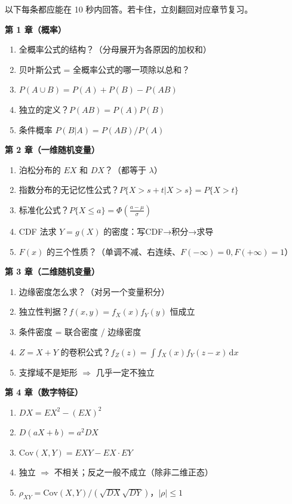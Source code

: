 ﻿\documentclass[lang=cn,11pt]{elegantbook}
\begin{document}
\begin{note}
以下每条都应能在 10 秒内回答。若卡住，立刻翻回对应章节复习。

\textbf{第 1 章（概率）}
\begin{enumerate}
    \item 全概率公式的结构？（分母展开为各原因的加权和）
    \item 贝叶斯公式 = 全概率公式的哪一项除以总和？
    \item $P(A\cup B)=P(A)+P(B)-P(AB)$
    \item 独立的定义？$P(AB)=P(A)P(B)$
    \item 条件概率 $P(B|A)=P(AB)/P(A)$
\end{enumerate}

\textbf{第 2 章（一维随机变量）}
\begin{enumerate}
    \item 泊松分布的 $EX$ 和 $DX$？（都等于 $\lambda$）
    \item 指数分布的无记忆性公式？$P\{X>s+t|X>s\}=P\{X>t\}$
    \item 标准化公式？$P\{X\leq a\}=\Phi\left(\frac{a-\mu}{\sigma}\right)$
    \item CDF 法求 $Y=g(X)$ 的密度：写CDF→积分→求导
    \item $F(x)$ 的三个性质？（单调不减、右连续、$F(-\infty)=0,F(+\infty)=1$）
\end{enumerate}

\textbf{第 3 章（二维随机变量）}
\begin{enumerate}
    \item 边缘密度怎么求？（对另一个变量积分）
    \item 独立性判据？$f(x,y)=f_X(x)f_Y(y)$ 恒成立
    \item 条件密度 = 联合密度 / 边缘密度
    \item $Z=X+Y$ 的卷积公式？$f_Z(z)=\int f_X(x)f_Y(z-x)\,\mathrm{d}x$
    \item 支撑域不是矩形 $\Rightarrow$ 几乎一定不独立
\end{enumerate}

\textbf{第 4 章（数字特征）}
\begin{enumerate}
    \item $DX=EX^2-(EX)^2$
    \item $D(aX+b)=a^2 DX$
    \item $\mathrm{Cov}(X,Y)=EXY-EX\cdot EY$
    \item 独立 $\Rightarrow$ 不相关；反之一般不成立（除非二维正态）
    \item $\rho_{XY}=\mathrm{Cov}(X,Y)/(\sqrt{DX}\sqrt{DY})$，$|\rho|\leq 1$
\end{enumerate}


\end{note}
\end{document}

